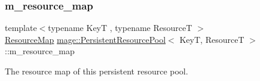 \subsubsection{\texorpdfstring{m\+\_\+resource\+\_\+map}{m\_resource\_map}}
{\footnotesize\ttfamily template$<$typename KeyT , typename ResourceT $>$ \\
\hyperlink{classmage_1_1_persistent_resource_pool_a9215c5816fc45ab5f772625df2a8a60c}{Resource\+Map} \hyperlink{classmage_1_1_persistent_resource_pool}{mage\+::\+Persistent\+Resource\+Pool}$<$ KeyT, ResourceT $>$\+::m\+\_\+resource\+\_\+map\hspace{0.3cm}{\ttfamily [private]}}

The resource map of this persistent resource pool. 